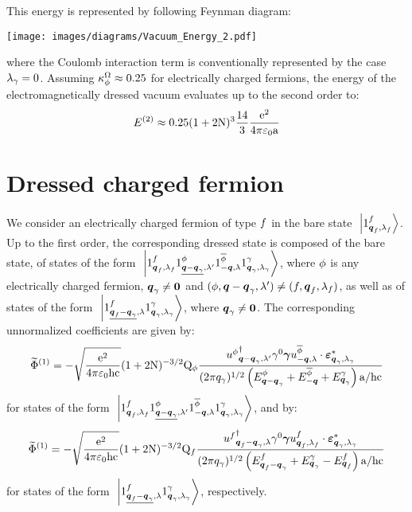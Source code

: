 This energy is represented by following Feynman diagram:
\begin{center}
\texttt{[image: images/diagrams/Vacuum\_Energy\_2.pdf]}
\end{center}
where the Coulomb interaction term is conventionally  represented by the case $\lambda_\gamma = 0$.
Assuming $\kappa^\Omega_\phi \approx 0.25$ for electrically charged fermions, the energy of the electromagnetically dressed vacuum evaluates up to the second order to:
\begin{equation*}
E^{(2)} \approx 0.25 ( 1 + 2 \mathrm N )^3 \frac {14} 3 \frac{\mathrm e^2}{4 \pi \mathrm \varepsilon_0 \mathrm a}
\end{equation*}

\section{Dressed charged fermion}


We consider an electrically charged fermion of type $f$ in the bare state $\ \left|{{1}^{f}_{{\boldsymbol{q}_f}, {\lambda_f}}}\right\rangle$. Up to the first order, the corresponding dressed state is composed of the bare state, of states of the form $\ \left|{{1}^{f}_{{\boldsymbol{q}_f}, {\lambda_f}} {1}^{\phi}_{{\underline{\boldsymbol{q}-\boldsymbol{q}_\gamma}}, {\lambda'}} {1}^{\overline{\phi}}_{{-\boldsymbol{q}}, {\lambda}} {1}^{\gamma}_{{\boldsymbol{q}_\gamma}, {\lambda_\gamma}}}\right\rangle$, where $\phi$ is any electrically charged fermion, $\boldsymbol{q}_\gamma \neq \boldsymbol{0}$ and $(\phi, \boldsymbol{q}-\boldsymbol{q}_\gamma, \lambda') \neq (f, \boldsymbol{q}_f, \lambda_f)$, as well as of states of the form $\ \left|{{1}^{f}_{{\underline{\boldsymbol{q}_f - \boldsymbol{q}_\gamma}}, {\lambda}} {1}^{\gamma}_{{\boldsymbol{q}_\gamma}, {\lambda_\gamma}}}\right\rangle$, where $\boldsymbol{q}_\gamma \neq \boldsymbol{0}$. The corresponding unnormalized coefficients  are given by:
\begin{equation*}
\widetilde{\Phi}^{(1)} = - \sqrt{\frac{\mathrm e^2}{4 \pi \mathrm \varepsilon_0 \mathrm h \mathrm c}} ( 1 + 2 \mathrm N )^{-3/2} \mathrm Q_{\phi} \frac{{u^{\phi}}^{\dagger}_{{\boldsymbol{q} - \boldsymbol{q}_\gamma}, {\lambda'}} \gamma^{0} \boldsymbol{\gamma} u^{\overline{\phi}}_{{-\boldsymbol{q}}, {\lambda}} \cdot \boldsymbol{\varepsilon}_{{\boldsymbol{q}_\gamma},{\lambda_\gamma}}^*}{( 2 \pi q_\gamma )^{1 / 2} \left( E^{\phi}_{\boldsymbol{q} - \boldsymbol{q}_\gamma} + E^{\overline{\phi}}_{-\boldsymbol{q}} + E^{\gamma}_{\boldsymbol{q}_\gamma} \right) \mathrm a / \mathrm h \mathrm c}
\end{equation*}
for states of the form $\ \left|{{1}^{f}_{{\boldsymbol{q}_f}, {\lambda_f}} {1}^{\phi}_{{\underline{\boldsymbol{q}-\boldsymbol{q}_\gamma}}, {\lambda'}} {1}^{\overline{\phi}}_{{-\boldsymbol{q}}, {\lambda}} {1}^{\gamma}_{{\boldsymbol{q}_\gamma}, {\lambda_\gamma}}}\right\rangle$, and by:
\begin{equation*}
\widetilde{\Phi}^{(1)} = - \sqrt{\frac{\mathrm e^2}{4 \pi \mathrm \varepsilon_0 \mathrm h \mathrm c}} ( 1 + 2 \mathrm N )^{-3/2} \mathrm Q_{f} \frac{{u^{f}}^{\dagger}_{{\boldsymbol{q}_f - \boldsymbol{q}_\gamma}, {\lambda}} \gamma^{0} \boldsymbol{\gamma} u^{f}_{{\boldsymbol{q}_f}, {\lambda_f}} \cdot \boldsymbol{\varepsilon}_{{\boldsymbol{q}_\gamma},{\lambda_\gamma}}^*}{( 2 \pi q_\gamma )^{1 / 2} \left( E^{f}_{\boldsymbol{q}_f - \boldsymbol{q}_\gamma} + E^{\gamma}_{\boldsymbol{q}_\gamma} - E^{f}_{\boldsymbol{q}_f} \right) \mathrm a / \mathrm h \mathrm c}
\end{equation*}
for states of the form $\ \left|{{1}^{f}_{{\underline{\boldsymbol{q}_f - \boldsymbol{q}_\gamma}}, {\lambda}} {1}^{\gamma}_{{\boldsymbol{q}_\gamma}, {\lambda_\gamma}}}\right\rangle$, respectively.

